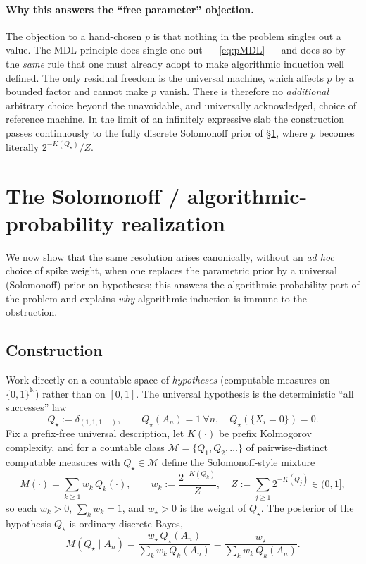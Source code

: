 \documentclass{amsart}
\theoremstyle{definition}
\newcommand{\N}{\mathbb{N}}
\begin{document}
\paragraph{Why this answers the ``free parameter'' objection.}
The objection to a hand-chosen $p$ is that nothing in the problem singles out a
value. The MDL principle does single one out --- \eqref{eq:pMDL} --- and does so
by the \emph{same} rule that one must already adopt to make algorithmic induction
well defined. The only residual freedom is the universal machine, which affects
$p$ by a bounded factor and cannot make $p$ vanish. There is therefore no
\emph{additional} arbitrary choice beyond the unavoidable, and universally
acknowledged, choice of reference machine. In the limit of an infinitely
expressive slab the construction passes continuously to the fully discrete
Solomonoff prior of \S\ref{sec:solomonoff}, where $p$ becomes literally
$2^{-K(Q_\star)}/Z$.

\section{The Solomonoff / algorithmic-probability realization}\label{sec:solomonoff}

We now show that the same resolution arises canonically, without an \emph{ad hoc}
choice of spike weight, when one replaces the parametric prior by a universal
(Solomonoff) prior on hypotheses; this answers the algorithmic-probability part
of the problem and explains \emph{why} algorithmic induction is immune to the
obstruction.

\subsection{Construction}
Work directly on a countable space of \emph{hypotheses} (computable measures on
$\{0,1\}^\N$) rather than on $[0,1]$. The universal hypothesis is the
deterministic ``all successes'' law
\begin{equation}\label{eq:Qstar}
  Q_\star:=\delta_{(1,1,1,\dots)},\qquad Q_\star(A_n)=1\ \forall n,\quad
  Q_\star(\{X_i=0\})=0 .
\end{equation}
Fix a prefix-free universal description, let $K(\cdot)$ be prefix Kolmogorov
complexity, and for a countable class $\mathcal M=\{Q_1,Q_2,\dots\}$ of
pairwise-distinct computable measures with $Q_\star\in\mathcal M$ define the
Solomonoff-style mixture
\begin{equation}\label{eq:Mprior}
  M(\cdot)=\sum_{k\ge1} w_k\,Q_k(\cdot),\qquad
  w_k:=\frac{2^{-K(Q_k)}}{Z},\quad Z:=\sum_{j\ge1}2^{-K(Q_j)}\in(0,1],
\end{equation}
so each $w_k>0$, $\sum_k w_k=1$, and $w_\star>0$ is the weight of $Q_\star$. The
posterior of the hypothesis $Q_\star$ is ordinary discrete Bayes,
\begin{equation}\label{eq:solpost}
  M(Q_\star\mid A_n)=\frac{w_\star\,Q_\star(A_n)}{\sum_k w_k\,Q_k(A_n)}
  =\frac{w_\star}{\sum_k w_k\,Q_k(A_n)} .
\end{equation}
\end{document}
